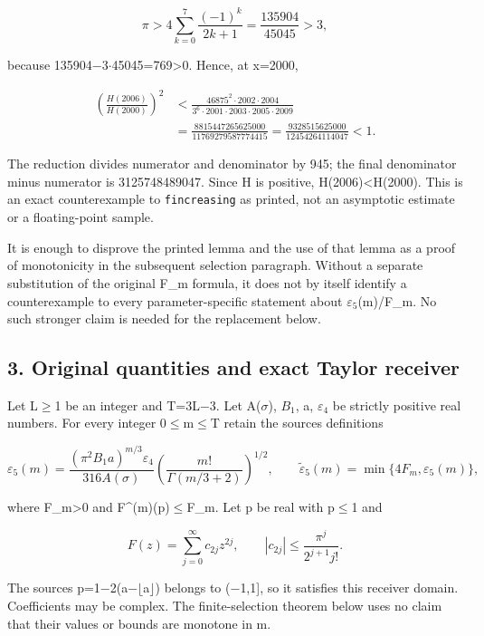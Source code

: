 \documentclass[11pt]{article}
\begin{document}
\[
\pi>4\sum_{k=0}^{7}\frac{(-1)^k}{2k+1}
=\frac{135904}{45045}>3,
\]

because 135904\ensuremath{-}3\ensuremath{\cdot}45045=769\textgreater0. Hence, at x=2000,

\[
\begin{aligned}
\left(\frac{H(2006)}{H(2000)}\right)^2
&<\frac{46875^2\cdot2002\cdot2004}
{3^6\cdot2001\cdot2003\cdot2005\cdot2009}\\
&=\frac{8815447265625000}{11769279587774415}
=\frac{9328515625000}{12454264114047}<1.
\end{aligned}
\]

The reduction divides numerator and denominator by 945; the final denominator minus numerator is 3125748489047. Since H is positive, H(2006)\textless H(2000). This is an exact counterexample to \texttt{fincreasing} as printed, not an asymptotic estimate or a floating-point sample.

It is enough to disprove the printed lemma and the use of that lemma as a proof of monotonicity in the subsequent selection paragraph. Without a separate substitution of the original F\_m formula, it does not by itself identify a counterexample to every parameter-specific statement about \ensuremath{\varepsilon_{5}}(m)/F\_m. No such stronger claim is needed for the replacement below.

\subsection{3. Original quantities and exact Taylor receiver}\label{aindependent:original-quantities-and-exact-taylor-receiver}

Let L\ensuremath{\ge}1 be an integer and T=3L\ensuremath{-}3. Let A(\ensuremath{\sigma}), \ensuremath{B_{1}}, a, \ensuremath{\varepsilon_{4}} be strictly positive real numbers. For every integer 0\ensuremath{\le}m\ensuremath{\le}T retain the source\textquotesingle s definitions

\[
\varepsilon_5(m)
=\frac{(\pi^2 B_1a)^{m/3}\varepsilon_4}{316A(\sigma)}
\left(\frac{m!}{\Gamma(m/3+2)}\right)^{1/2},
\qquad
\widetilde\varepsilon_5(m)=\min\{4F_m,\varepsilon_5(m)\},
\]

where F\_m\textgreater0 and \textbar F\^{}(m)(p)\textbar\ensuremath{\le}F\_m. Let p be real with \textbar p\textbar\ensuremath{\le}1 and

\[
F(z)=\sum_{j=0}^{\infty}c_{2j}z^{2j},\qquad
|c_{2j}|\le\frac{\pi^j}{2^{j+1}j!}.
\]

The source\textquotesingle s p=1\ensuremath{-}2(a\ensuremath{-}\ensuremath{\lfloor}a\ensuremath{\rfloor}) belongs to (\ensuremath{-}1,1{]}, so it satisfies this receiver domain. Coefficients may be complex. The finite-selection theorem below uses no claim that their values or bounds are monotone in m.
\end{document}
